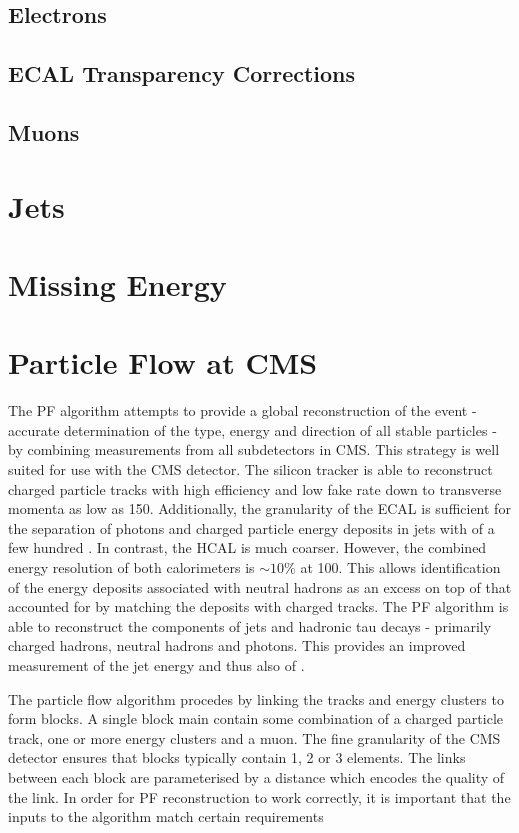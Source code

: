 \subsection{Electrons}
\subsection{\ac{ECAL} Transparency Corrections}
\label{sec:reco_ecal_transparency}
\subsection{Muons}
\section{Jets}
\section{Missing Energy}

\section{Particle Flow at \ac{CMS}}
The \ac{PF} algorithm \cite{cms_pf_pas} attempts to provide a global
reconstruction of the event - accurate determination of the type, energy and
direction of all stable particles - by combining measurements from all
subdetectors in \ac{CMS}. This strategy is well suited for use with the \ac{CMS}
detector. The silicon tracker is able to reconstruct charged particle tracks
with high efficiency and low fake rate down to transverse momenta as low as
\unit{150}{\MeV}. Additionally, the granularity of the \ac{ECAL} is sufficient
for the separation of photons and charged particle energy deposits in jets with
\Pt of a few hundred \GeV. In contrast, the \ac{HCAL} is much coarser. However,
the combined energy resolution of both calorimeters is $\sim 10\%$ at
\unit{100}{\GeV}. This allows identification of the energy deposits associated
with neutral hadrons as an excess on top of that accounted for by matching the
deposits with charged tracks. The \ac{PF} algorithm is able to reconstruct the
components of jets and hadronic tau decays - primarily charged hadrons, neutral
hadrons and photons. This provides an improved measurement of the jet energy and
thus also of \MET.

The particle flow algorithm procedes by linking the tracks and energy clusters
to form blocks. A single block main contain some combination of a charged
particle track, one or more energy clusters and a muon. The fine granularity of
the \ac{CMS} detector ensures that blocks typically contain 1, 2 or 3 elements.
The links between each block are parameterised by a distance which encodes the
quality of the link. In order for \ac{PF} reconstruction to work correctly, it
is important that the inputs to the algorithm match certain requirements

